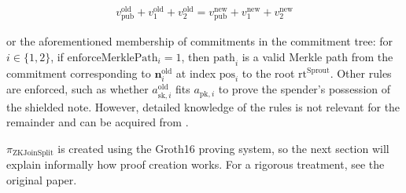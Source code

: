 \documentclass{article}
\begin{document}
\begin{align}v_\text{pub}^\text{old} + v_1^\text{old} + v_2^\text{old} = v_\text{pub}^\text{new} + v_1^\text{new} + v_2^\text{new} \label{eq:balance}\end{align}

or the aforementioned membership of commitments in the commitment tree: for $i \in \{1,2\}$, if $\text{enforceMerklePath}_i = 1$, then $\text{path}_i$ is a valid Merkle path from the commitment corresponding to $\boldsymbol{n}_i^\text{old}$ at index $\text{pos}_i$ to the root $\text{rt}^\text{Sprout}$.
Other rules are enforced, such as whether $a^\text{old}_{\text{sk},i}$ fits $a_{\text{pk},i}$ to prove the spender's possession of the shielded note. However, detailed knowledge of the rules is not relevant for the remainder and can be acquired from \cite{hopwood:zcash}.

$\pi_\text{ZKJoinSplit}$ is created using the Groth16 \cite{groth:zksnark} proving system, so the next section will explain informally how proof creation works.
For a rigorous treatment, see the original paper.
\end{document}
